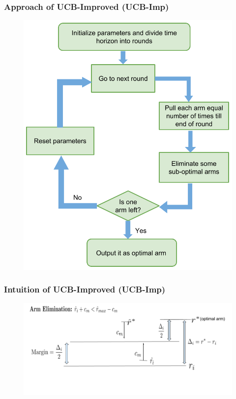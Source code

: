 \begin{frame}
\frametitle{Approach of UCB-Improved (UCB-Imp)}
\begin{figure}
\includegraphics[scale=0.25]{img/Ucb-Imp.png}
\end{figure}
\end{frame}



\begin{frame}
\frametitle{Intuition of UCB-Improved (UCB-Imp)}
\begin{figure}
\includegraphics[scale=0.3]{img/Ucb_Imp_intuition.png}
\end{figure}
\end{frame}


